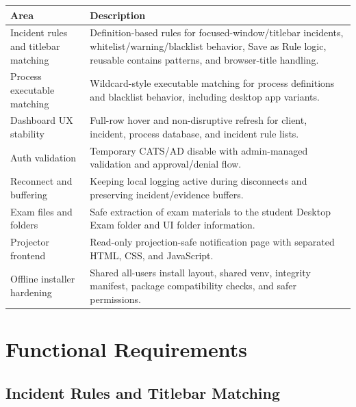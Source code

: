 \documentclass[12pt,a4paper]{article}
\begin{document}
\begin{longtable}{L{0.26\textwidth} L{0.64\textwidth}}
\textbf{Area} & \textbf{Description} \\
\hline
Incident rules and titlebar matching & Definition-based rules for focused-window/titlebar incidents, whitelist/warning/blacklist behavior, Save as Rule logic, reusable contains patterns, and browser-title handling. \\
Process executable matching & Wildcard-style executable matching for process definitions and blacklist behavior, including desktop app variants. \\
Dashboard UX stability & Full-row hover and non-disruptive refresh for client, incident, process database, and incident rule lists. \\
Auth validation & Temporary CATS/AD disable with admin-managed validation and approval/denial flow. \\
Reconnect and buffering & Keeping local logging active during disconnects and preserving incident/evidence buffers. \\
Exam files and folders & Safe extraction of exam materials to the student Desktop Exam folder and UI folder information. \\
Projector frontend & Read-only projection-safe notification page with separated HTML, CSS, and JavaScript. \\
Offline installer hardening & Shared all-users install layout, shared venv, integrity manifest, package compatibility checks, and safer permissions. \\
\end{longtable}

\section{Functional Requirements}

\subsection{Incident Rules and Titlebar Matching}
\end{document}
